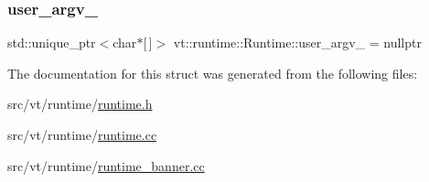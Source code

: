 \subsubsection{\texorpdfstring{user\+\_\+argv\+\_\+}{user\_argv\_}}
{\footnotesize\ttfamily std\+::unique\+\_\+ptr$<$char$\ast$\mbox{[}$\,$\mbox{]}$>$ vt\+::runtime\+::\+Runtime\+::user\+\_\+argv\+\_\+ = nullptr\hspace{0.3cm}{\ttfamily [protected]}}



The documentation for this struct was generated from the following files\+:\begin{DoxyCompactItemize}
\item 
src/vt/runtime/\hyperlink{runtime_8h}{runtime.\+h}\item 
src/vt/runtime/\hyperlink{runtime_8cc}{runtime.\+cc}\item 
src/vt/runtime/\hyperlink{runtime__banner_8cc}{runtime\+\_\+banner.\+cc}\end{DoxyCompactItemize}
